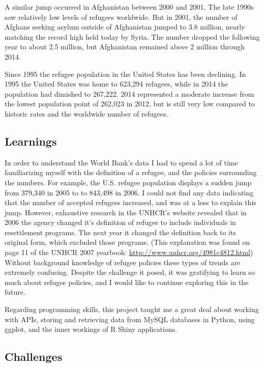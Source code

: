 \documentclass{article}
\begin{document}
\noindent A similar jump occurred in Afghanistan between 2000 and 2001. The late 1990s saw relatively low levels of refugees worldwide. But in 2001, the number of Afghans seeking asylum outside of Afghanistan jumped to 3.8 million, nearly matching the record high held today by Syria. The number dropped the following year to about 2.5 million, but Afghanistan remained above 2 million through 2014.\vspace{2mm}

\noindent 
Since 1995 the refugee population in the United States has been declining. In 1995 the United States was home to 623,294 refugees, while in 2014 the population had dimished to 267,222. 2014 represented a moderate increase from the lowest population point of 262,023 in 2012, but is still very low compared to historic rates and the worldwide number of refugees.


\subsection{Learnings}

\noindent In order to understand the World Bank's data I had to spend a lot of time familiarizing myself with the definition of a refugee, and the policies surrounding the numbers. For example, the U.S. refugee population displays a sudden jump from 379,340 in 2005 to to 843,498 in 2006. I could not find any data indicating that the number of accepted refugees increased, and was at a loss to explain this jump. However, exhaustive research in the UNHCR's website revealed that in 2006 the agency changed it's definition of refugee to include individuals in resettlement programs. The next year it changed the definition back to its original form, which excluded those programs. (This explanation was found on page 11 of the UNHCR 2007 yearbook: \url{http://www.unhcr.org/4981c4812.html}) Without background knowledge of refugee policies these types of trends are extremely confusing. Despite the challenge it posed, it was gratifying to learn so much about refugee policies, and I would like to continue exploring this in the future. \vspace{2mm}

\noindent Regarding programming skills, this project taught me a great deal about working with APIs, storing and retrieving data from MySQL databases in Python, using ggplot, and the inner workings of R Shiny applications. 

\subsection{Challenges}
\end{document}
